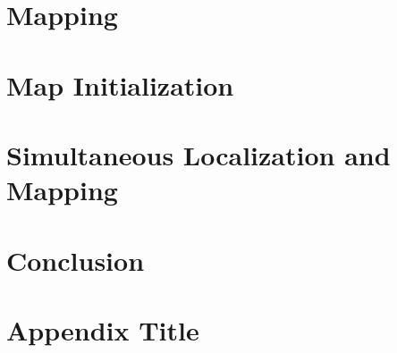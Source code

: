 \documentclass{eplmastersthesis}
\begin{document}
\chapter{Mapping}


\chapter{Map Initialization}


\chapter{Simultaneous Localization and Mapping}




\chapter{Conclusion}


\printbibliography

\appendix
\chapter{Appendix Title}


\end{document}
